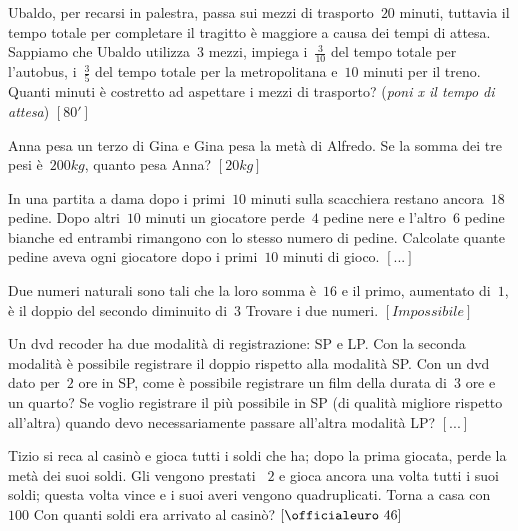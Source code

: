 \begin{multicols}{2}
\begin{esercizio}[\Ast]
\label{ese:14.50}
Ubaldo, per recarsi in palestra, passa sui mezzi di trasporto~\(20\) minuti, 
tuttavia il tempo totale per completare il tragitto è maggiore a causa dei tempi 
di attesa. Sappiamo che Ubaldo utilizza~\(3\) mezzi, impiega i~\(\frac{3}{10}\) del 
tempo totale per l'autobus, i~\(\frac{3}{5}\) del tempo totale per la 
metropolitana e~\(10\) minuti per il treno. Quanti minuti è costretto ad aspettare 
i mezzi di trasporto? (\emph{poni x il tempo di attesa})
 \hfill \(\left[80'\right]\)
\end{esercizio}

\begin{esercizio}[\Ast]
\label{ese:14.51}
Anna pesa un terzo di Gina e Gina pesa la metà di Alfredo. Se la somma dei tre 
pesi è~\(200\unit{kg}\), quanto pesa Anna? \hfill \(\left[20\unit{kg}\right]\)
\end{esercizio}

\begin{esercizio}
\label{ese:14.52}
In una partita a dama dopo i primi~\(10\) minuti sulla scacchiera restano 
ancora~\(18\) pedine. Dopo altri~\(10\) minuti un giocatore perde~\(4\) pedine nere e 
l'altro~\(6\) pedine bianche ed entrambi rimangono con lo stesso numero di pedine. 
Calcolate quante pedine aveva ogni giocatore dopo i primi~\(10\) minuti di gioco.
 \hfill \(\left[...\right]\)
\end{esercizio}

\begin{esercizio}[\Ast]
\label{ese:14.53}
Due numeri naturali sono tali che la loro somma è~\(16\) e il primo, aumentato 
di~\(1\), è il doppio del secondo diminuito di~\(3\) Trovare i due numeri.
 \hfill \(\left[Impossibile\right]\)
\end{esercizio}

\begin{esercizio}
\label{ese:14.54}
Un dvd recoder ha due modalità di registrazione: SP e LP. Con la seconda 
modalità è possibile registrare il doppio rispetto alla modalità SP. Con un dvd 
dato per~\(2\) ore in SP, come è possibile registrare un film della durata di~\(3\) 
ore e un quarto? Se voglio registrare il più possibile in SP (di qualità 
migliore rispetto all'altra) quando devo necessariamente passare all'altra 
modalità LP? \hfill \(\left[...\right]\)
\end{esercizio}

\begin{esercizio}[\Ast]
\label{ese:14.55}
Tizio si reca al casinò e gioca tutti i soldi che ha; dopo la prima giocata, 
perde la metà dei suoi soldi. Gli vengono prestati \officialeuro~\(2\) e gioca 
ancora una volta tutti i suoi soldi; questa volta vince e i suoi averi vengono 
quadruplicati. Torna a casa con \officialeuro~\(100\) Con quanti soldi era 
arrivato al casinò? \hfill \(\left[\officialeuro~46\right]\)
\end{esercizio}


\end{multicols}

